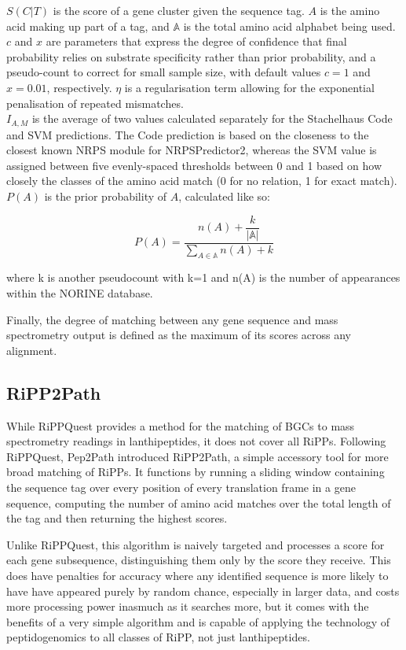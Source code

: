 \documentclass{l4proj}
\newcommand{\cit}[1]{\citep{#1}}
\newcommand{\pa}{
	\begin{equation} \label{eq:pa}
		P(A) = \dfrac{n(A) + \dfrac{k}{|\mathbb{A}|}}{\sum_{A \in \mathbb{A}}{n(A) + k}}
	\end{equation}
}
\begin{document}
\(S(C|T)\) is the score of a gene cluster given the sequence tag. \(A\) is the amino acid making up part of a tag, and \(\mathbb{A}\) is the total amino acid alphabet being used. \(c\) and \(x\) are parameters that express the degree of confidence that final probability relies on substrate specificity rather than prior probability, and a pseudo-count to correct for small sample size, with default values \(c=1\) and \(x=0.01\), respectively. \(\eta\) is a regularisation term allowing for the exponential penalisation of repeated mismatches. \\

\(I_{A, M}\) is the average of two values calculated separately for the Stachelhaus Code and SVM predictions. The Code prediction is based on the closeness to the closest known NRPS module for NRPSPredictor2, whereas the SVM value is assigned between five evenly-spaced thresholds between 0 and 1 based on how closely the classes of the amino acid match (0 for no relation, 1 for exact match). \\

\(P(A)\) is the prior probability of \(A\), calculated like so:

\pa

where k is another pseudocount with k=1 and n(A) is the number of appearances within the NORINE database. \cit{norine}

Finally, the degree of matching between any gene sequence and mass spectrometry output is defined as the maximum of its scores across any alignment.

\subsection{RiPP2Path}

While RiPPQuest provides a method for the matching of BGCs to mass spectrometry readings in lanthipeptides, it does not cover all RiPPs. Following RiPPQuest, Pep2Path introduced RiPP2Path, a simple accessory tool for more broad matching of RiPPs. It functions by running a sliding window containing the sequence tag over every position of every translation frame in a gene sequence, computing the number of amino acid matches over the total length of the tag and then returning the highest scores.

Unlike RiPPQuest, this algorithm is naively targeted and processes a score for each gene subsequence, distinguishing them only by the score they receive. This does have penalties for accuracy where any identified sequence is more likely to have have appeared purely by random chance, especially in larger data, and costs more processing power inasmuch as it searches more, but it comes with the benefits of a very simple algorithm and is capable of applying the technology of peptidogenomics to all classes of RiPP, not just lanthipeptides.
\end{document}
